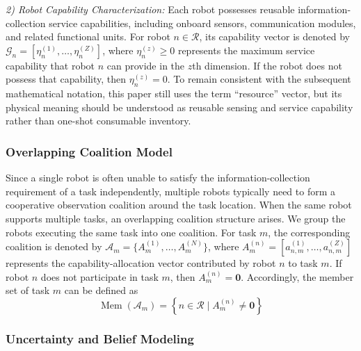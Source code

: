 \documentclass[journal,twoside,web]{ieeecolor}
\begin{document}
\noindent\textit{2) Robot Capability Characterization:} Each robot possesses reusable information-collection service capabilities, including onboard sensors, communication modules, and related functional units. For robot $n \in \mathcal{R}$, its capability vector is denoted by $\mathcal{G}_n = [\eta_n^{(1)}, \dots, \eta_n^{(Z)}]$, where $\eta_n^{(z)} \ge 0$ represents the maximum service capability that robot $n$ can provide in the $z$th dimension. If the robot does not possess that capability, then $\eta_n^{(z)} = 0$. To remain consistent with the subsequent mathematical notation, this paper still uses the term ``resource'' vector, but its physical meaning should be understood as reusable sensing and service capability rather than one-shot consumable inventory.
\subsubsection{Overlapping Coalition Model}
Since a single robot is often unable to satisfy the information-collection requirement of a task independently, multiple robots typically need to form a cooperative observation coalition around the task location. When the same robot supports multiple tasks, an overlapping coalition structure arises. We group the robots executing the same task into one coalition. For task $m$, the corresponding coalition is denoted by $\mathcal{A}_m = \{A_m^{(1)}, \dots, A_m^{(N)}\}$, where $A_m^{(n)} = \left[a_{n,m}^{(1)}, \dots, a_{n,m}^{(Z)}\right]$ represents the capability-allocation vector contributed by robot $n$ to task $m$. If robot $n$ does not participate in task $m$, then $A_m^{(n)} = \mathbf{0}$. Accordingly, the member set of task $m$ can be defined as
\begin{equation}
\operatorname{Mem}(\mathcal{A}_m) = \left\{ n \in \mathcal{R} \mid A_m^{(n)} \neq \mathbf{0} \right\}
\label{eq:coalition_members}
\end{equation}

\subsubsection{Uncertainty and Belief Modeling}
\end{document}

